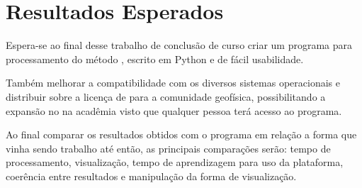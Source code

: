 \chapter{Resultados Esperados}
    \label{cap-resultados}
    Espera-se ao final desse trabalho de conclusão de curso criar um programa para processamento do método \MT, escrito em Python e de fácil usabilidade.
    
    Também melhorar a compatibilidade com os diversos sistemas operacionais e distribuir sobre a licença de  para a comunidade geofísica, possibilitando a expansão no \MT na acadêmia visto que qualquer pessoa terá acesso ao programa.
    
    Ao final comparar os resultados obtidos com o programa em relação a forma que vinha sendo trabalho até então, as principais comparações serão: tempo de processamento, visualização, tempo de aprendizagem para uso da plataforma, coerência entre resultados e manipulação da forma de visualização. 
